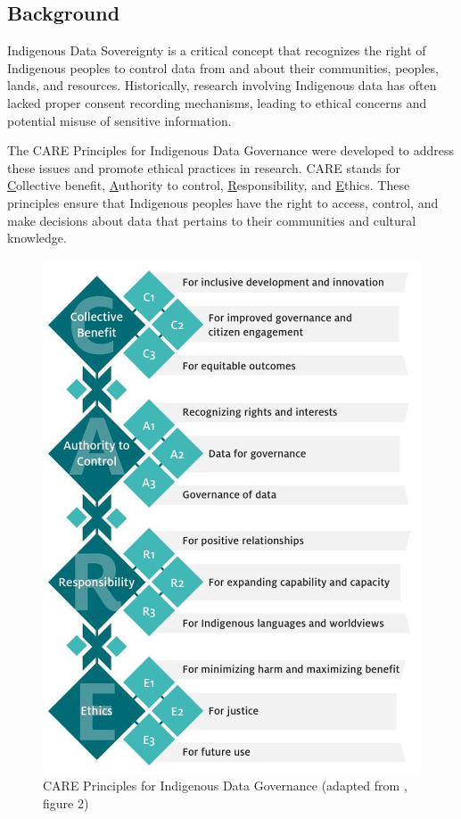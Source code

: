 \documentclass[a0,portrait]{a0poster}
\begin{document}
\setlength{\columnsep}{2cm}
\begin{multicols}{2}

\color{ARDCPink}
\section*{\LARGE Background}
\color{DarkGrey}
\large{
Indigenous Data Sovereignty is a critical concept that recognizes the right of Indigenous peoples to control data from and about their communities, peoples, lands, and resources. Historically, research involving Indigenous data has often lacked proper consent recording mechanisms, leading to ethical concerns and potential misuse of sensitive information.

The CARE Principles for Indigenous Data Governance were developed to address these issues and promote ethical practices in research. CARE stands for \underline{C}ollective benefit, \underline{A}uthority to control, \underline{R}esponsibility, and \underline{E}thics. These principles ensure that Indigenous peoples have the right to access, control, and make decisions about data that pertains to their communities and cultural knowledge.

\par
\begin{figure}
\vspace{-1cm}  %
\includegraphics[width=0.43\columnwidth]{figures/CARE-principles.png}
\caption{CARE Principles for Indigenous Data Governance (adapted from \textcite{Carroll2020}, figure 2)}
\vspace{1cm}  %
\end{figure}

}
\end{multicols}
\end{document}
